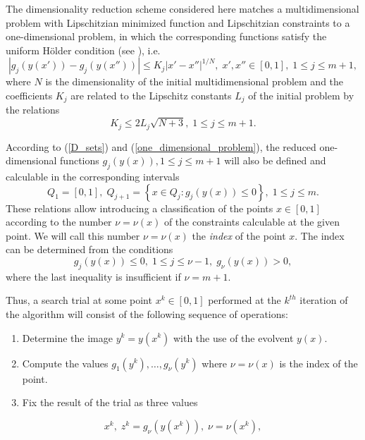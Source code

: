 \documentclass[review]{elsarticle}
\begin{document}
	The dimensionality reduction scheme considered here matches a multidimensional problem with Lipschitzian minimized function and Lipschitzian constraints to a one-dimensional problem, in which the corresponding functions satisfy the uniform H\"{o}lder condition (see \cite{Strongin2000, Sergeyev2013}), i.e.
$$
	\left|g_j(y(x'))-g_j(y(x''))\right| \leq K_j \left|x'-x'' \right|^{1/N}, \; x', x''\in [0,1], \; 1\leq j \leq m+1,
$$
where $N$ is the dimensionality of the initial multidimensional problem and the coefficients $K_j$ are related to the Lipschitz constants $L_j$ of the initial problem by the relations
\begin{equation}\label{K_leq_L}
	K_j \leq 2L_j \sqrt{N+3}, \; 1\leq j \leq m+1.
\end{equation}

	According to (\ref{D_sets}) and (\ref{one_dimensional_problem}), the reduced one-dimensional functions $g_j (y(x)), 1 \leq j \leq m+1$ will also be defined and calculable in the corresponding intervals 
\begin{equation}\label{Q_intervals}
	Q_1=[0,1], \; Q_{j+1}=\left\{x \in Q_j : g_j(y(x)) \leq 0 \right\}, \; 1 \leq j \leq m.
\end{equation}
These relations allow introducing a classification of the points $x \in [0,1]$ according to the number $\nu = \nu(x)$ of the constraints calculable at the given point. We will call this number $\nu = \nu(x)$ the \textit{index} of the point $x$. The index can be determined from the conditions 
$$
	g_j(y(x)) \leq 0, \; 1 \leq j \leq \nu-1, \; g_{\nu}(y(x))>0,
$$
where the last inequality is insufficient if $\nu = m+1$. 

	Thus, a search trial at some point $x^k \in [0,1]$ performed at the $k^{th}$ iteration of the algorithm will consist of the following sequence of operations:
\begin{enumerate} 
  \item Determine the image $y^k=y(x^k )$ with the use of the evolvent $y(x)$. 
  \item Compute the values $g_1 (y^k ), \ldots ,g_{\nu} (y^k )$ where $\nu = \nu(x)$ is the index of the point.
	\item Fix the result of the trial as three values 
\end{enumerate}
	
\begin{equation}\label{trial_result}
	x^k, \; z^k = g_{\nu}\left( y(x^k) \right), \; \nu = \nu(x^k),
\end{equation}
\end{document}
